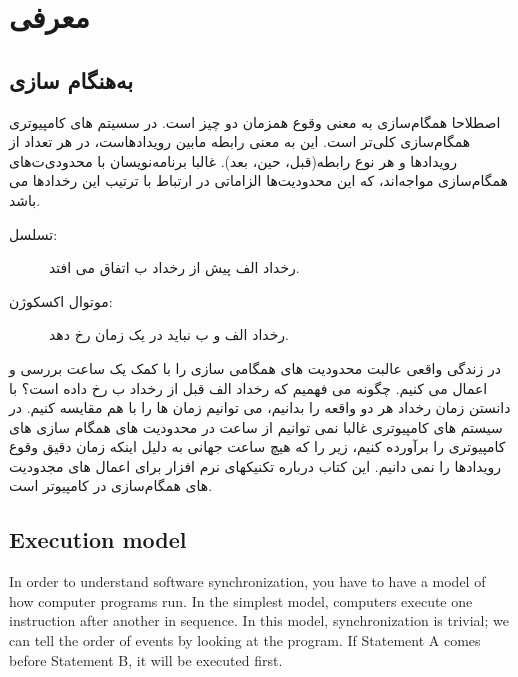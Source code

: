 \documentclass{book}
\newcommand{\clearemptydoublepage}{\newpage\cleardoublepage}
\begin{document}

\tableofcontents
\clearemptydoublepage

\mainmatter


\chapter{معرفی}

\section{به‌هنگام سازی}
\label{synch}

اصطلاحا همگام‌سازی به معنی وقوع همزمان دو چیز است. در سسیتم های کامپیوتری همگام‌سازی کلی‌تر است. این به معنی رابطه مابین رویدادهاست، در هر تعداد از رویدادها و هر نوع رابطه(قبل، حین، بعد).
غالبا برنامه‌نویسان با محدودی‌ت‌های همگام‌سازی مواجه‌اند، که این محدودیت‌ها الزاماتی در ارتباط با ترتیب این رخدادها می باشد.

\begin{description}

\item[تسلسل:] رخداد الف پیش از رخداد ب اتفاق می افتد.

\item[موتوال اکسکوژن:] رخداد الف و ب نباید در یک زمان رخ دهد.

\end{description}
در زندگی واقعی عالبت محدودیت های همگامی سازی را با کمک یک ساعت بررسی و اعمال می کنیم. چگونه می فهمیم که رخداد الف قبل از رخداد ب رخ داده است؟ با دانستن زمان رخداد هر دو واقعه را بدانیم، می توانیم زمان ها را با هم مقایسه کنیم.
در سیستم های کامپیوتری غالبا نمی توانیم از ساعت در محدودیت های همگام سازی های کامپیوتری را برآورده کنیم، زیر را که هیچ ساعت جهانی به دلیل اینکه زمان دقیق وقوع رویدادها را نمی دانیم.
این کتاب درباره تکنیکهای نرم افزار برای اعمال های مجدودیت های همگام‌سازی در کامپیوتر است.



\section {Execution model}

In order to understand software synchronization, you have to
have a model of how computer programs run.  In the simplest
model, computers execute one instruction after another in
sequence.  In this model, synchronization is trivial; we can
tell the order of events by looking at the program.  If Statement
A comes before Statement B, it will be executed first.
\end{document}
